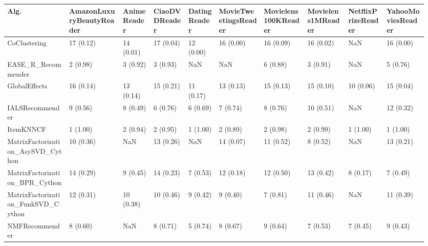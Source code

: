 \begin{tabular}{llllllllll}
\toprule
                               Alg. & AmazonLuxuryBeautyReader & AnimeReader & CiaoDVDReader & DatingReader & MovieTweetingsReader & Movielens100KReader & Movielens1MReader & NetflixPrizeReader & YahooMoviesReader \\
\midrule
                       CoClustering &                17 (0.12) &   14 (0.01) &     17 (0.04) &    12 (0.00) &            16 (0.00) &           16 (0.09) &         16 (0.02) &                NaN &         16 (0.00) \\
                 EASE\_R\_Recommender &                 2 (0.98) &    3 (0.92) &      3 (0.93) &          NaN &                  NaN &            6 (0.88) &          3 (0.91) &                NaN &          5 (0.76) \\
                      GlobalEffects &                16 (0.14) &   13 (0.14) &     15 (0.21) &    11 (0.17) &            13 (0.13) &           15 (0.13) &         15 (0.10) &          10 (0.06) &         15 (0.04) \\
                    IALSRecommender &                 9 (0.56) &    8 (0.49) &      6 (0.76) &     6 (0.69) &             7 (0.74) &            8 (0.76) &         10 (0.51) &                NaN &         12 (0.32) \\
                          ItemKNNCF &                 1 (1.00) &    2 (0.94) &      2 (0.95) &     1 (1.00) &             2 (0.89) &            2 (0.98) &          2 (0.99) &           1 (1.00) &          1 (1.00) \\
  MatrixFactorization\_AsySVD\_Cython &                10 (0.36) &         NaN &     13 (0.26) &          NaN &            14 (0.07) &           11 (0.52) &          8 (0.52) &                NaN &         13 (0.21) \\
     MatrixFactorization\_BPR\_Cython &                14 (0.29) &    9 (0.45) &     14 (0.23) &     7 (0.53) &            12 (0.18) &           12 (0.50) &         13 (0.42) &           8 (0.17) &          7 (0.49) \\
 MatrixFactorization\_FunkSVD\_Cython &                12 (0.31) &   10 (0.38) &     10 (0.46) &     9 (0.42) &             9 (0.40) &            7 (0.81) &         11 (0.46) &                NaN &         11 (0.39) \\
                     NMFRecommender &                 8 (0.60) &         NaN &      8 (0.71) &     5 (0.74) &             8 (0.67) &            9 (0.64) &          7 (0.53) &           7 (0.45) &          9 (0.43) \\

\end{tabular}
